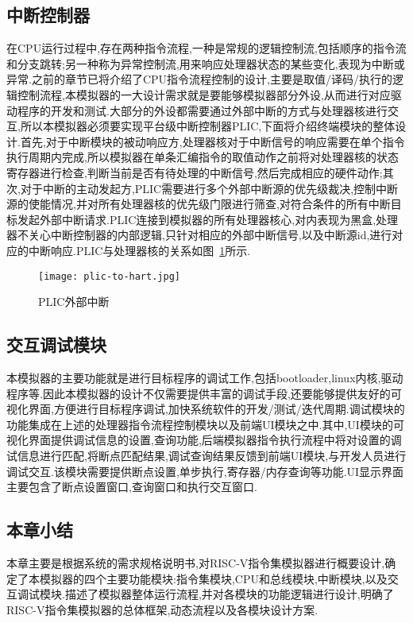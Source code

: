 \subsection{中断控制器}
在CPU运行过程中,存在两种指令流程,一种是常规的逻辑控制流,包括顺序的指令流和分支跳转;另一种称为异常控制流,用来响应处理器状态的某些变化,表现为中断或异常.之前的章节已将介绍了CPU指令流程控制的设计,主要是取值/译码/执行的逻辑控制流程,本模拟器的一大设计需求就是要能够模拟器部分外设,从而进行对应驱动程序的开发和测试.大部分的外设都需要通过外部中断的方式与处理器核进行交互,所以本模拟器必须要实现平台级中断控制器PLIC,下面将介绍终端模块的整体设计.首先,对于中断模块的被动响应方,处理器核对于中断信号的响应需要在单个指令执行周期内完成,所以模拟器在单条汇编指令的取值动作之前将对处理器核的状态寄存器进行检查,判断当前是否有待处理的中断信号,然后完成相应的硬件动作;其次,对于中断的主动发起方,PLIC需要进行多个外部中断源的优先级裁决,控制中断源的使能情况,并对所有处理器核的优先级门限进行筛查,对符合条件的所有中断目标发起外部中断请求.PLIC连接到模拟器的所有处理器核心,对内表现为黑盒,处理器不关心中断控制器的内部逻辑,只针对相应的外部中断信号,以及中断源id,进行对应的中断响应.PLIC与处理器核的关系如图~\ref{fig:plic-to-hart}所示.
\begin{figure}[h]
  \centering
  \texttt{[image: plic-to-hart.jpg]}
  \caption{PLIC外部中断}
  \label{fig:plic-to-hart}
\end{figure}


\subsection{交互调试模块}
本模拟器的主要功能就是进行目标程序的调试工作,包括bootloader,linux内核,驱动程序等.因此本模拟器的设计不仅需要提供丰富的调试手段,还要能够提供友好的可视化界面,方便进行目标程序调试,加快系统软件的开发/测试/迭代周期.调试模块的功能集成在上述的处理器指令流程控制模块以及前端UI模块之中.其中,UI模块的可视化界面提供调试信息的设置,查询功能,后端模拟器指令执行流程中将对设置的调试信息进行匹配,将断点匹配结果,调试查询结果反馈到前端UI模块,与开发人员进行调试交互.该模块需要提供断点设置,单步执行,寄存器/内存查询等功能.UI显示界面主要包含了断点设置窗口,查询窗口和执行交互窗口.

\subsection{本章小结}
本章主要是根据系统的需求规格说明书,对RISC-V指令集模拟器进行概要设计,确定了本模拟器的四个主要功能模块:指令集模块,CPU和总线模块,中断模块,以及交互调试模块.描述了模拟器整体运行流程,并对各模块的功能逻辑进行设计,明确了RISC-V指令集模拟器的总体框架,动态流程以及各模块设计方案.